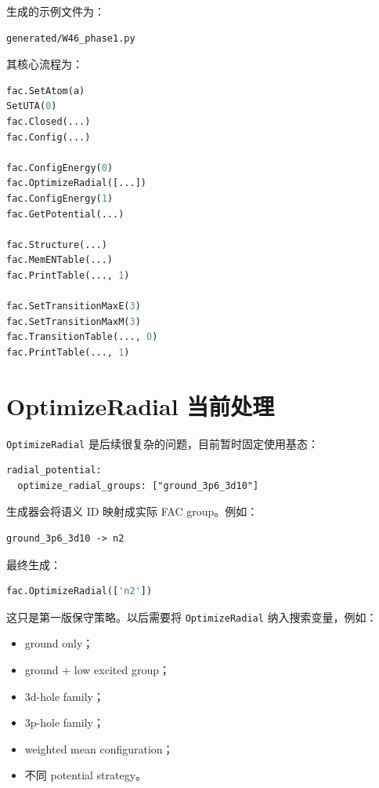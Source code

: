 \documentclass[11pt,a4paper]{article}
\begin{document}
生成的示例文件为：

\begin{lstlisting}
generated/W46_phase1.py
\end{lstlisting}

其核心流程为：

\begin{lstlisting}[language=Python]
fac.SetAtom(a)
SetUTA(0)
fac.Closed(...)
fac.Config(...)

fac.ConfigEnergy(0)
fac.OptimizeRadial([...])
fac.ConfigEnergy(1)
fac.GetPotential(...)

fac.Structure(...)
fac.MemENTable(...)
fac.PrintTable(..., 1)

fac.SetTransitionMaxE(3)
fac.SetTransitionMaxM(3)
fac.TransitionTable(..., 0)
fac.PrintTable(..., 1)
\end{lstlisting}

\section{OptimizeRadial 当前处理}

\texttt{OptimizeRadial} 是后续很复杂的问题，目前暂时固定使用基态：

\begin{lstlisting}
radial_potential:
  optimize_radial_groups: ["ground_3p6_3d10"]
\end{lstlisting}

生成器会将语义 ID 映射成实际 FAC group。例如：

\begin{lstlisting}
ground_3p6_3d10 -> n2
\end{lstlisting}

最终生成：

\begin{lstlisting}[language=Python]
fac.OptimizeRadial(['n2'])
\end{lstlisting}

这只是第一版保守策略。以后需要将 \texttt{OptimizeRadial} 纳入搜索变量，例如：

\begin{itemize}
  \item ground only；
  \item ground + low excited group；
  \item 3d-hole family；
  \item 3p-hole family；
  \item weighted mean configuration；
  \item 不同 potential strategy。
\end{itemize}
\end{document}
